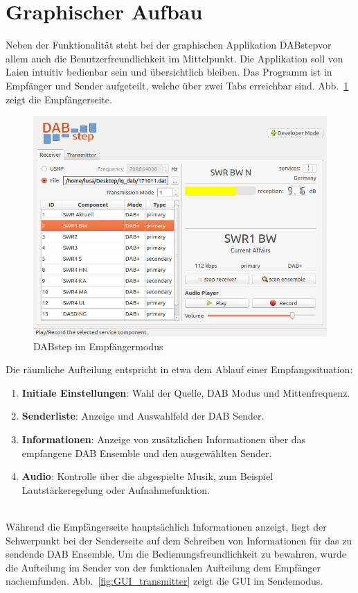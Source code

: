 \section{Graphischer Aufbau}
Neben der Funktionalität steht bei der graphischen Applikation \dq DABstep\dq vor allem auch die Benutzerfreundlichkeit im Mittelpunkt. Die Applikation soll von Laien intuitiv bedienbar sein und übersichtlich bleiben. Das Programm ist in Empfänger und Sender aufgeteilt, welche über zwei Tabs erreichbar sind. Abb.~\ref{fig:GUI_receiver} zeigt die Empfängerseite.
\begin{figure}[htb]
\centering
  \includegraphics[width=\textwidth]{figures/GUI_receiver.png}
	\caption{DABstep im Empfängermodus}
	\label{fig:GUI_receiver}
\end{figure}
Die räumliche Aufteilung entspricht in etwa dem Ablauf einer Empfangssituation:
\begin{enumerate}
\item \textbf{Initiale Einstellungen}: Wahl der Quelle, DAB Modus und Mittenfrequenz.
\item \textbf{Senderliste}: Anzeige und Auswahlfeld der DAB Sender.
\item \textbf{Informationen}: Anzeige von zusätzlichen Informationen über das empfangene DAB Ensemble und den ausgewählten Sender.
\item \textbf{Audio}: Kontrolle über die abgespielte Musik, zum Beispiel Lautstärkeregelung oder Aufnahmefunktion.
\end{enumerate}
\\
Während die Empfängerseite hauptsächlich Informationen anzeigt, liegt der Schwerpunkt bei der Senderseite auf dem Schreiben von Informationen für das zu sendende DAB Ensemble. Um die Bedienungsfreundlichkeit zu bewahren, wurde die Aufteilung im Sender von der funktionalen Aufteilung dem Empfänger nachemfunden. Abb.~\ref{fig:GUI_transmitter} zeigt die GUI im Sendemodus.
